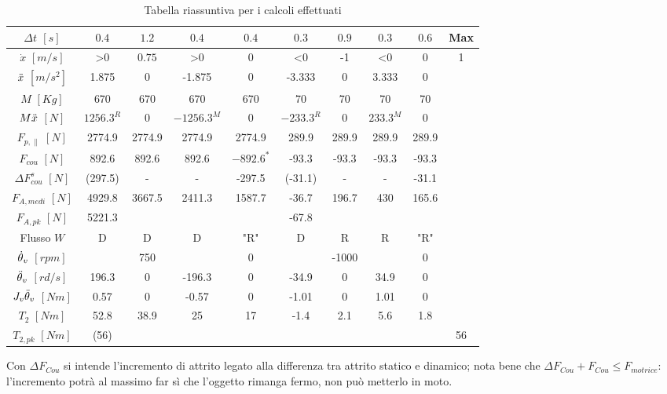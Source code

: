 \begin{table}[h]
\centering
    \begin{tabular}{c|c|c|c|c|c|c|c|c|c}
    \hline
    $\Delta t$ $[s]$ & $0.4$ & $1.2$ & $0.4$ & $0.4$ & $0.3$ & $0.9$ & $0.3$ & $0.6$ & Max \\ \hline
    $\dot x$ $[m/s]$ & >0 & \(0.75\) & >0 & 0 & <0 & -1 & <0 & 0 & 1 \\ \cline{1-1}
    $\Ddot x$ $[m/s^2]$ & 1.875 & 0 & -1.875 & 0 & -3.333 & 0 & 3.333 & 0 &  \\ \cline{1-1}
    $M$ $[Kg]$ & 670 & 670 & 670 & 670 & 70 & 70 & 70 & 70 &  \\ \cline{1-1}
    \hline
    $M \Ddot x$ $[N]$ & \(1256.3^R\) & 0 & \(-1256.3^M\) & 0 & \(-233.3^R\) & 0 & \(233.3^M\) & 0 &  \\ \cline{1-1}
    $F_{p,\parallel}$ $[N]$ & 2774.9 & 2774.9 & 2774.9 & 2774.9 & 289.9 & 289.9 & 289.9 & 289.9 &  \\ \cline{1-1}
    $F_{cou}$ $[N]$ & 892.6 & 892.6 & 892.6 & \(-892.6^*\) & -93.3 & -93.3 & -93.3 & -93.3 &  \\ \cline{1-1}
    $\Delta F_{cou}^s$ $[N]$ & (297.5) & - & - & -297.5 & (-31.1) & - & - & -31.1 &  \\ \cline{1-1}
    \hline
    $F_{A,medi}$ $[N]$ & 4929.8 & 3667.5 & 2411.3 & 1587.7 & -36.7 & 196.7 & 430 & 165.6 &  \\ \cline{1-1}
    $F_{A,pk}$ $[N]$ & 5221.3 &  &  &  & -67.8 &  &  &  &  \\ \cline{1-1}
    Flusso $W$ & D & D & D & "R" & D & R & R & "R" &  \\ \cline{1-1}
    \hline
    $\dot{\theta}_v$ $[rpm]$ &  & 750 &  & 0 &  & -1000 &  & 0 &  \\ \cline{1-1}
    $\Ddot{\theta}_v$ $[rd/s]$ & 196.3 & 0 & -196.3 & 0 & -34.9 & 0 & 34.9 & 0 &  \\ \cline{1-1}
    \hline
    $J_v\Ddot{\theta}_v$ $[Nm]$  & 0.57 & 0 & -0.57 & 0 & -1.01 & 0 & 1.01 & 0 &  \\ \cline{1-1}
    $T_2$ $[Nm]$ & 52.8 & 38.9 & 25 & 17 & -1.4 & 2.1 & 5.6 & 1.8 &  \\ \cline{1-1}
    $T_{2,pk}$ $[Nm]$ & (56) &  &  &  &  &  &  &  & 56 \\ \cline{1-1}
    \hline
    \end{tabular}
    \caption{Tabella riassuntiva per i calcoli effettuati}
\end{table}

Con $\Delta F_{Cou}$ si intende l'incremento di attrito legato alla differenza tra attrito statico e dinamico; nota bene che $\Delta F_{Cou} + F_{Cou} \leqslant F_{motrice}$: l'incremento potrà al massimo far sì che l'oggetto rimanga fermo, non può metterlo in moto.

